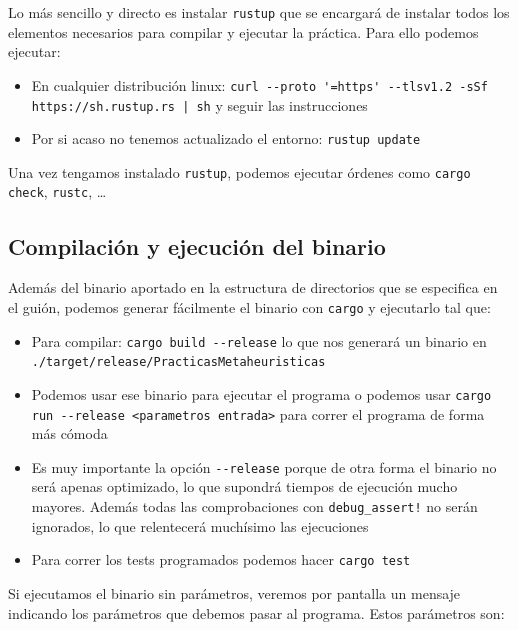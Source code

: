 \documentclass[11pt]{article}
\begin{document}
Lo más sencillo y directo es instalar \lstinline{rustup} \footnotemark que se encargará de instalar todos los elementos necesarios para compilar y ejecutar la práctica. Para ello podemos ejecutar:

\begin{itemize}
    \item En cualquier distribución linux: \lstinline{curl --proto '=https' --tlsv1.2 -sSf https://sh.rustup.rs | sh} y seguir las instrucciones
    \item Por si acaso no tenemos actualizado el entorno: \lstinline{rustup update}
\end{itemize}

Una vez tengamos instalado \lstinline{rustup}, podemos ejecutar órdenes como \lstinline{cargo check}, \lstinline{rustc}, \ldots


\subsection{Compilación y ejecución del binario}

Además del binario aportado en la estructura de directorios que se especifica en el guión, podemos generar fácilmente el binario con \lstinline{cargo} y ejecutarlo tal que:

\begin{itemize}
    \item Para compilar: \lstinline{cargo build --release} lo que nos generará un binario en \lstinline{./target/release/PracticasMetaheuristicas}
    \item Podemos usar ese binario para ejecutar el programa o podemos usar \lstinline{cargo run --release <parametros entrada>} para correr el programa de forma más cómoda
    \item Es muy importante la opción \lstinline{--release} porque de otra forma el binario no será apenas optimizado, lo que supondrá tiempos de ejecución mucho mayores. Además todas las comprobaciones con \lstinline{debug_assert!} no serán ignorados, lo que relentecerá muchísimo las ejecuciones
    \item Para correr los tests programados podemos hacer \lstinline{cargo test}
\end{itemize}

Si ejecutamos el binario sin parámetros, veremos por pantalla un mensaje indicando los parámetros que debemos pasar al programa. Estos parámetros son:
\end{document}
